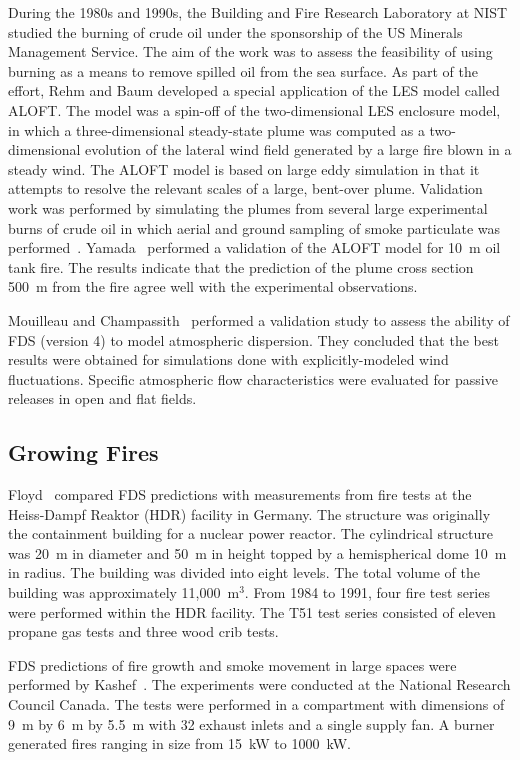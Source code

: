 During the 1980s and 1990s, the Building and Fire Research Laboratory at NIST studied the burning of crude oil under the sponsorship of the US Minerals Management Service. The aim of the work was to assess the feasibility of using burning as a means to remove spilled oil from the sea surface. As part of the effort, Rehm and Baum developed a special application of the LES model called ALOFT. The model was a spin-off of the two-dimensional LES enclosure model, in which a three-dimensional steady-state plume was computed as a two-dimensional evolution of the lateral wind field generated by a large fire blown in a steady wind. The ALOFT model is based on large eddy simulation in that it attempts to resolve the relevant scales of a large, bent-over plume. Validation work was performed by simulating the plumes from several large experimental burns of crude oil in which aerial and ground sampling of smoke    particulate was performed~\cite{McGrattan:4a}. Yamada~\cite{ALOFT:2} performed a validation of the ALOFT model for 10~m oil tank fire. The results indicate that the prediction of the plume cross section 500~m from the fire agree well with the experimental observations.

Mouilleau and Champassith~\cite{JLP:2009} performed a validation study to assess the ability of FDS (version 4) to model atmospheric dispersion. They concluded that the best results were obtained for simulations done with explicitly-modeled wind fluctuations. Specific atmospheric flow characteristics were evaluated for passive releases in open and flat fields.



\subsection{Growing Fires}
\label{growingfires}

Floyd~\cite{Floyd:5,Floyd:6} compared FDS predictions with measurements from fire tests at the Heiss-Dampf Reaktor (HDR) facility in Germany. The structure was originally the containment building for a nuclear power reactor. The cylindrical structure was 20~m in diameter and 50~m in height topped by a hemispherical dome 10~m in radius.  The building was divided into eight levels. The total volume of the building was approximately 11,000~m$^3$. From 1984 to 1991, four fire test series were performed within the HDR facility. The T51 test series consisted of eleven propane gas tests and three wood crib tests.

FDS predictions of fire growth and smoke movement in large spaces were performed by Kashef~\cite{Kashef:1}. The experiments were conducted at the National Research Council Canada. The tests were performed in a compartment with dimensions of 9~m by 6~m by 5.5~m with 32 exhaust inlets and a single supply fan. A burner generated fires ranging in size from 15~kW to 1000~kW.


